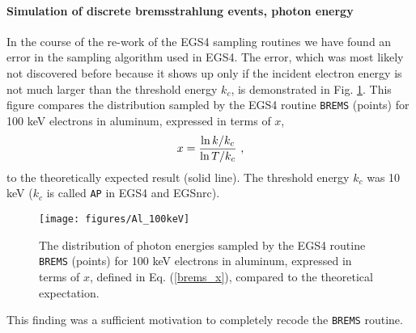 \paragraph{Simulation of discrete bremsstrahlung events, photon energy}
\hfill
{}


In the course of the re-work of the EGS4 sampling routines
we have found an error in the sampling algorithm used in
EGS4. The error, which was most likely not discovered before
because it shows up only if the incident electron energy is
not much larger than the threshold energy $k_c$, is
demonstrated in Fig. \ref{brems_fig2}. This figure compares the distribution
sampled by the EGS4 routine {\tt BREMS} (points) for 100 keV
electrons in aluminum, expressed in
terms of $x$,
\begin{equation}
\label{brems_x}
x = {\ln k/k_c \over \ln T/k_c}~,
\end{equation}
to the theoretically expected result (solid line). The threshold
energy $k_c$ was 10 keV ($k_c$ is called {\tt AP} in EGS4 and EGSnrc).
\begin{figure}[htp]
\texttt{[image: figures/Al\_100keV]}
\caption[{\tt BREMS} bug in EGS4]{\label{brems_fig2}
The distribution of photon energies
sampled by the EGS4 routine {\tt BREMS} (points) for 100 keV
electrons in aluminum, expressed in terms of $x$, defined in
Eq. (\protect\ref{brems_x}), compared to the theoretical
expectation.}
\end{figure}
This finding was a sufficient motivation to completely recode
the {\tt BREMS} routine.

